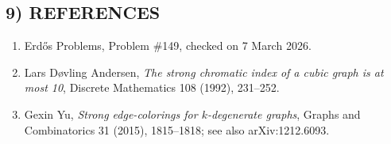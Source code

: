 \subsection*{9) REFERENCES}
\begin{enumerate}
\item Erd\H{o}s Problems, Problem \#149, checked on 7 March 2026.
\item Lars D{\o}vling Andersen, \emph{The strong chromatic index of a cubic graph is at most 10}, Discrete Mathematics 108 (1992), 231--252.
\item Gexin Yu, \emph{Strong edge-colorings for $k$-degenerate graphs}, Graphs and Combinatorics 31 (2015), 1815--1818; see also arXiv:1212.6093.
\end{enumerate}

